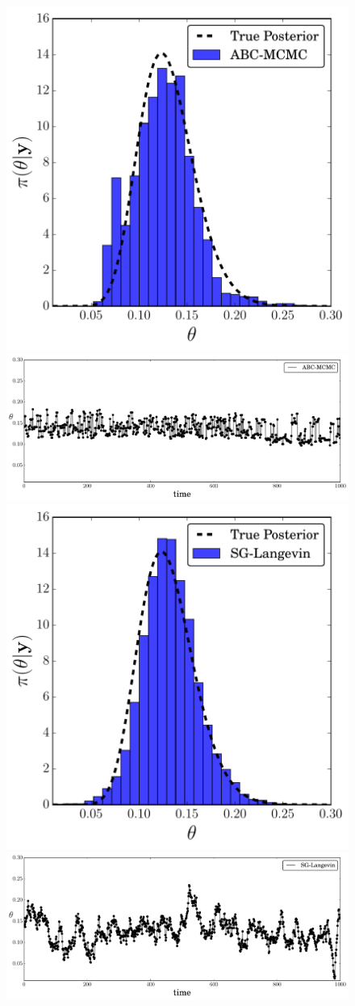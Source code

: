 \documentclass[]{article}
\begin{document}
 

\begin{figure}[t]
\vskip 0.2in
\setlength{\linewidth}{\textwidth}
\setlength{\hsize}{\textwidth}
\begin{center}
\includegraphics[width=0.5\columnwidth]{./images/exp-ABC-MCMC-posterior_hist.pdf}
\includegraphics[width=1.2\columnwidth]{./images/exp-ABC-MCMC-theta-timeseries.pdf}
\includegraphics[width=0.5\columnwidth]{./images/exp-SG-Langevin-posterior_hist.pdf}
\includegraphics[width=1.2\columnwidth]{./images/exp-SG-Langevin-theta-timeseries.pdf}

\end{center}
\end{figure}
\end{document}
